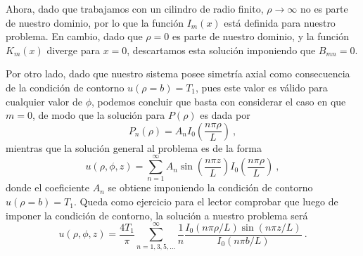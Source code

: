 \begin{ejemplo}
    Ahora, dado que trabajamos con un cilindro de radio finito, $\rho \to \infty$ no es parte de nuestro dominio, por lo que la función $I_m(x)$ está definida para nuestro problema. En cambio, dado que $\rho = 0$ es parte de nuestro dominio, y la función $K_m(x)$ diverge para $x = 0$, descartamos esta solución imponiendo que $B_{mn} = 0$.

    Por otro lado, dado que nuestro sistema posee simetría axial como consecuencia de la condición de contorno $u(\rho = b) = T_1$, pues este valor es válido para cualquier valor de $\phi$, podemos concluir que basta con considerar el caso en que $m=0$, de modo que la solución para $P(\rho)$ es dada por
    \begin{equation*}
        P_n(\rho) = A_n I_0\left( \frac{n \pi \rho}{L} \right) \ ,
    \end{equation*}
    mientras que la solución general al problema es de la forma
    \begin{equation*}
        u(\rho, \phi, z) = \sum_{n=1}^\infty A_n \sin\left( \frac{n \pi z}{L} \right) I_0 \left( \frac{n \pi \rho}{L} \right) \ ,
    \end{equation*}
    donde el coeficiente $A_n$ se obtiene imponiendo la condición de contorno $u(\rho = b) = T_1$. Queda como ejercicio para el lector comprobar que luego de imponer la condición de contorno, la solución a nuestro problema será
    \begin{equation*}
        u(\rho, \phi, z) = \frac{4T_1}{\pi} \sum_{n=1, 3, 5, \dots}^\infty \frac{1}{n} \frac{I_0(n \pi \rho/L) \sin(n \pi z/L)}{I_0(n \pi b/L)} \ .
    \end{equation*}
\end{ejemplo}


